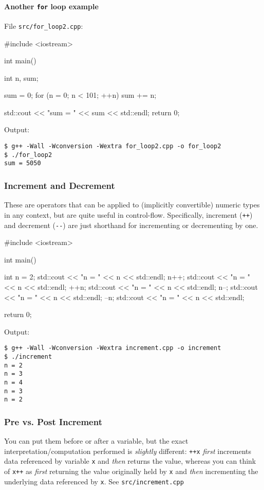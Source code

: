 \documentclass[12pt,letterpaper,twoside]{article}
\begin{document}
\paragraph{\texorpdfstring{Another \texttt{for} loop
example}{Another for loop example}}

File \texttt{src/for\_loop2.cpp}:
\begin{cpp}
#include <iostream>

int main() {
  int n, sum;

  sum = 0;
  for (n = 0; n < 101; ++n) {
    sum += n;
  }

  std::cout << "sum = " << sum << std::endl;
  return 0;
}
\end{cpp}

Output:

\begin{verbatim}
$ g++ -Wall -Wconversion -Wextra for_loop2.cpp -o for_loop2
$ ./for_loop2
sum = 5050
\end{verbatim}

\subsubsection{Increment and Decrement}
These are operators that can be applied to (implicitly convertible)
numeric types in any context, but are quite useful in control-flow.
Specifically, increment (\texttt{++}) and decrement (\texttt{-\/-}) are just
shorthand for incrementing or decrementing by one.

\begin{cpp}
#include <iostream>

int main() {
  int n = 2;
  std::cout << "n = " << n << std::endl;
  n++;
  std::cout << "n = " << n << std::endl;
  ++n;
  std::cout << "n = " << n << std::endl;
  n--;
  std::cout << "n = " << n << std::endl;
  --n;
  std::cout << "n = " << n << std::endl;

  return 0;
}
\end{cpp}

Output:

\begin{verbatim}
$ g++ -Wall -Wconversion -Wextra increment.cpp -o increment
$ ./increment
n = 2
n = 3
n = 4
n = 3
n = 2
\end{verbatim}


\subsubsection{Pre vs. Post Increment}
You can put them before or after a variable, but the exact
interpretation/computation performed is \emph{slightly} different:
\texttt{++x} \emph{first} increments data referenced by variable \texttt{x} and
\emph{then} returns the value, whereas you can think of \texttt{x++}
as \emph{first}
returning the value originally held by \texttt{x} and \emph{then}
incrementing the underlying data referenced by \texttt{x}.
See \texttt{src/increment.cpp}
\end{document}
